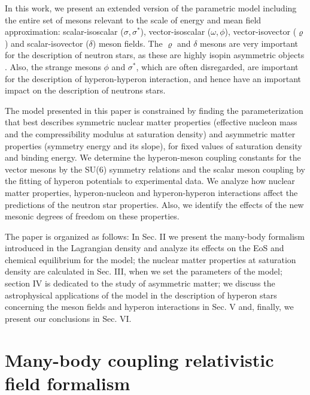 \documentclass[twocolumn,showpacs,aps]{revtex4}
\begin{document}
In this work, we present an extended version of the parametric model including the entire set of mesons
relevant to the scale of energy and mean field approximation: scalar-isoscalar ($\sigma$,$\,\sigma^*$), 
vector-isoscalar ($\omega$,$\,\phi$), vector-isovector ($\varrho$) and scalar-isovector ($\delta$) meson fields.
The $\varrho$ and $\delta$ mesons are very important for the
description of neutron stars, as these are highly isopin asymmetric objects \cite{Kubis:1997ew,Liu:2001iz,Menezes:2004vr}. 
Also, the strange mesons $\phi$ and $\sigma^*$, which are often disregarded, are important for the description of 
hyperon-hyperon interaction, and hence have an important impact on the description of neutrons stars.

The model presented in this paper is constrained by finding the parameterization that best describes symmetric nuclear matter properties (effective nucleon mass and the 
compressibility modulus at saturation density) and asymmetric matter properties (symmetry energy and its slope), for fixed values of saturation density and 
binding energy. 
We determine the hyperon-meson coupling constants for the vector mesons by the SU(6) symmetry relations 
and the scalar meson coupling by the fitting of hyperon potentials to experimental data.
We analyze how nuclear matter properties, hyperon-nucleon and hyperon-hyperon interactions affect the predictions of the neutron star properties. 
Also, we identify the effects of the new mesonic degrees of freedom on these properties.
 
The paper is organized as follows: In Sec. II we present the many-body formalism introduced in the Lagrangian density and analyze
its effects on the EoS and chemical equilibrium for the model; the nuclear matter properties at saturation density are calculated in Sec. III,
when we set the parameters of the model; section IV is dedicated to the study of asymmetric matter; 
we discuss the astrophysical applications of the model in the description of hyperon stars
concerning the meson fields and hyperon interactions in Sec. V and, finally, we present our conclusions in Sec. VI.


 
\section{Many-body coupling relativistic field formalism} \label{Model}
\end{document}
